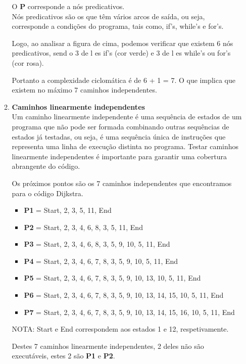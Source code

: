 \documentclass{article}
\begin{document}
\begin{itemize}
\begin{enumerate}
  O \textbf{P} corresponde a nós predicativos.\\

  Nós predicativos são os que têm vários arcos de saída, ou seja, corresponde a condições do programa, tais como, if's, while's e for's.

  \quad Logo, ao analisar a figura de cima, podemos verificar que existem 6 nós predicativos, send o  3  de l es if's (cor verde)  e  3  de l es while's ou for's (cor rosa).

  Portanto a complexidade ciclomática é de 6 + 1 = 7. O que implica que existem no máximo 7 caminhos independentes.
  
  \item \textbf{Caminhos linearmente independentes}\\

  \quad Um caminho linearmente independente é uma sequência de estados de um programa que não pode ser formada combinando outras sequências de estados já testadas, ou seja, é uma sequência única de instruções que representa uma linha de execução distinta no programa.
  Testar caminhos linearmente independentes é importante para garantir uma cobertura abrangente do código.

  Os próximos pontos são os 7 caminhos independentes que encontramos para o código Dijkstra.
  \begin{itemize}
    \item \textbf{P1} = {Start,  2, 3, 5, 11, End}
    \item \textbf{P2} = {Start, 2, 3, 4, 6, 8, 3, 5, 11, End}
    \item \textbf{P3} = {Start, 2, 3, 4, 6, 8, 3, 5, 9, 10, 5, 11, End}
    \item \textbf{P4} = {Start, 2, 3, 4, 6, 7, 8, 3, 5, 9, 10, 5, 11, End}
    \item \textbf{P5} = {Start, 2, 3, 4, 6, 7, 8, 3, 5, 9, 10, 13, 10, 5, 11, End}
    \item \textbf{P6} = {Start, 2, 3, 4, 6, 7, 8, 3, 5, 9, 10, 13, 14, 15, 10, 5, 11, End}
    \item \textbf{P7} = {Start, 2, 3, 4, 6, 7, 8, 3, 5, 9, 10, 13, 14, 15, 16, 10, 5, 11, End}
  \end{itemize}
  NOTA: Start e End correspondem aos estados 1 e 12, respetivamente.

  Destes 7 caminhos linearmente independentes, 2 deles não são executáveis, estes 2 são \textbf{P1} e \textbf{P2}.\\


\end{enumerate}
\end{itemize}
\end{document}
